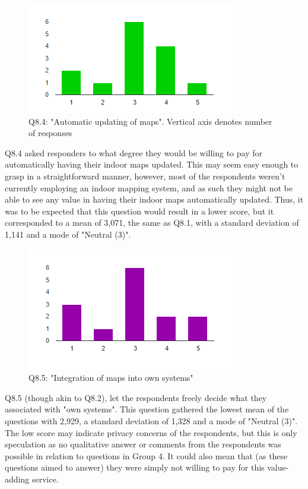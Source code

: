 \begin{figure}
\centering
\includegraphics{figs/q84.PNG}
\caption{Q8.4: "Automatic updating of maps". Vertical axis denotes number of responses}
\label{fig:q84}
\end{figure}
Q8.4 asked responders to what degree they would be willing to pay for automatically having their indoor maps updated. This may seem easy enough to grasp in a straightforward manner, however, most of the respondents weren't currently employing an indoor mapping system, and as such they might not be able to see any value in having their indoor maps automatically updated. Thus, it was to be expected that this question would result in a lower score, but it corresponded to a mean of 3,071, the same as Q8.1, with a standard deviation of 1,141 and a mode of "Neutral (3)". 
\begin{figure}
\centering
\includegraphics{figs/q85.PNG}
\caption{Q8.5: "Integration of maps into own systems"}
\label{fig:my_label}
\end{figure}
Q8.5 (though akin to Q8.2), let the respondents freely decide what they associated with "own systems". This question gathered the lowest mean of the questions with 2,929, a standard deviation of 1,328 and a mode of "Neutral (3)". The low score may indicate privacy concerns of the respondents, but this is only speculation as no qualitative answer or comments from the respondents was possible in relation to questions in Group 4. It could also mean that (as these questions aimed to answer) they were simply not willing to pay for this value-adding service.

